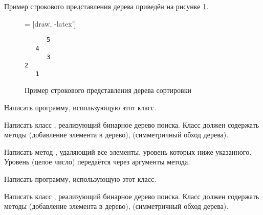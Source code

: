 Пример строкового представления дерева приведён на рисунке
\ref{fig:tree-sample}.

\begin{figure}
  \centering
  \begin{minipage}[c]{0.4\textwidth}
    \centering
     = [draw, -latex']
    \usetikzlibrary{shapes,positioning}
  \end{minipage}%
  \begin{minipage}[c]{0.2\textwidth}
    \begin{framed}
      \centering
\begin{verbatim}
      5
   4
      3
2
   1
\end{verbatim}
    \end{framed}
  \end{minipage}
  
  
  \caption{Пример строкового представления дерева
    сортировки\label{fig:tree-sample}}
\end{figure}

\begin{centering}
\end{centering}

Написать программу, использующую этот класс.

\task Написать класс , реализующий бинарное дерево
поиска. Класс должен содержать методы  (добавление элемента в
дерево),  (симметричный обход дерева).

Написать метод , удаляющий все элементы, уровень которых
ниже указанного. Уровень (целое число) передаётся через аргументы
метода.

Написать программу, использующую этот класс.

\task Написать класс , реализующий бинарное дерево
поиска. Класс должен содержать методы  (добавление элемента в
дерево),  (симметричный обход дерева).

